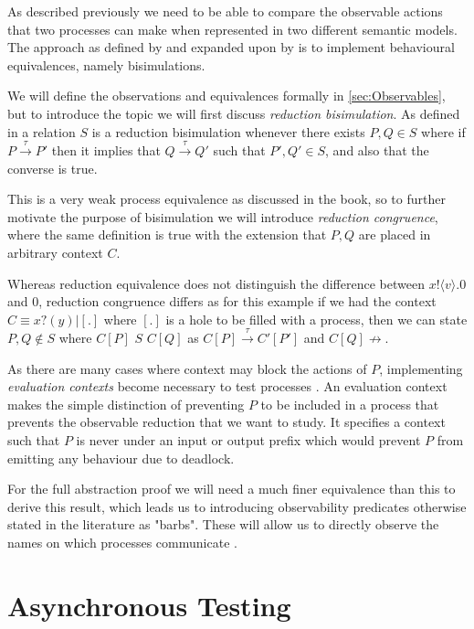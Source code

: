 As described previously we need to be able to compare the observable actions that two processes can make when represented in two different semantic models. The approach as defined by \citep{milner1992barbed} and expanded upon by \citep{sangiorgi2003pi} is to implement behavioural equivalences, namely bisimulations.

We will define the observations and equivalences formally in \autoref{sec:Observables}, but to introduce the topic we will first discuss \textit{reduction bisimulation}. As defined in \citep{sangiorgi2003pi} a relation $S$ is a reduction bisimulation whenever there exists $P, Q \in S$ where if $P \xrightarrow{\tau} P'$ then it implies that $Q \xrightarrow{\tau} Q'$ such that $P', Q' \in S$, and also that the converse is true. 

This is a very weak process equivalence as discussed in the book, so to further motivate the purpose of bisimulation we will introduce \textit{reduction congruence}, where the same definition is true with the extension that $P, Q$ are placed in arbitrary context $C$. 

Whereas reduction equivalence does not distinguish the difference between $x!\langle v \rangle.0$ and $0$, reduction congruence differs as for this example if we had the context $C \equiv x?(y) | [.]$ where $[.]$ is a hole to be filled with a process, then we can state $P, Q \not \in S$ where $C[P]$ $S$ $C[Q]$ as $C[P] \xrightarrow{\tau} C'[P']$ and $C[Q] \not \rightarrow$. 

As there are many cases where context may block the actions of $P$, implementing \textit{evaluation contexts} become necessary to test processes \cite{DBLP:journals/jlp/FournetG05}. An evaluation context makes the simple distinction of preventing $P$ to be included in a process that prevents the observable reduction that we want to study. It specifies a context such that $P$ is never under an input or output prefix which would prevent $P$ from emitting any behaviour due to deadlock.

For the full abstraction proof we will need a much finer equivalence than this to derive this result, which leads us to introducing observability predicates otherwise stated in the literature as "barbs". These will allow us to directly observe the names on which processes communicate \cite{sangiorgi2003pi}.

\section{Asynchronous Testing}\label{AsynTestingSection}

